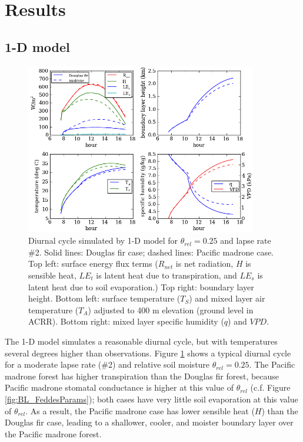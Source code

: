 \section{Results}

\subsection{1-D model}

\begin{figure}[here]
\includegraphics[width=0.9\textwidth]{ch2-BL/figures/testall_Aug15_soilm0pt25_ra10_lapseT2_cropped.png}
\caption{Diurnal cycle simulated by 1-D model for $\theta_{rel}=0.25$ and lapse rate \#2.  Solid lines: Douglas fir case; dashed lines: Pacific madrone case.  Top left: surface energy flux terms ($R_{net}$ is net radiation, $H$ is sensible heat, $LE_t$ is latent heat due to transpiration, and $LE_s$ is latent heat due to soil evaporation.)  Top right: boundary layer height.  Bottom left: surface temperature ($T_S$) and mixed layer air temperature ($T_A$) adjusted to 400 m elevation (ground level in ACRR).  Bottom right: mixed layer specific humidity ($q$) and $VPD$.}
\label{fig:BL_1Ddiurnal}
\end{figure}

The 1-D model simulates a reasonable diurnal cycle, but with temperatures several degrees higher than observations.  Figure \ref{fig:BL_1Ddiurnal} shows a typical diurnal cycle for a moderate lapse rate (\#2) and relative soil moisture $\theta_{rel} = 0.25$.  The Pacific madrone forest has higher transpiration than the Douglas fir forest, because Pacific madrone stomatal conductance is higher at this value of $\theta_{rel}$ (c.f. Figure \ref{fig:BL_FeddesParams}); both cases have very little soil evaporation at this value of $\theta_{rel}$.  As a result, the Pacific madrone case has lower sensible heat ($H$) than the Douglas fir case, leading to a shallower, cooler, and moister boundary layer over the Pacific madrone forest.

